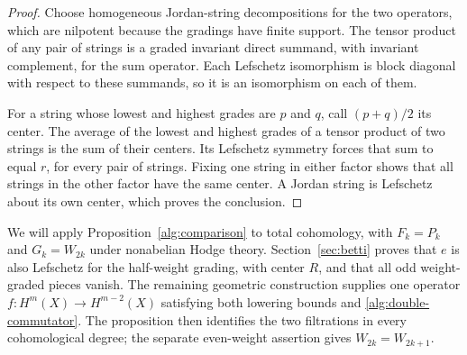 \begin{proof}
Choose homogeneous Jordan-string decompositions for the two operators,
which are nilpotent because the gradings have finite support.
The tensor product of any pair of strings is a graded invariant direct
summand, with invariant complement, for the sum operator.  Each
Lefschetz isomorphism is block diagonal with respect to these summands,
so it is an isomorphism on each of them.

For a string whose lowest and highest grades are $p$ and $q$, call
$(p+q)/2$ its center.  The average of the lowest and highest grades of
a tensor product of two strings is the sum of their centers.  Its
Lefschetz symmetry forces that sum to equal $r$, for every pair of
strings.  Fixing one string in either factor shows that all strings
in the other factor have the same center.  A Jordan string is
Lefschetz about its own center, which proves the conclusion.
\end{proof}

We will apply Proposition~\ref{alg:comparison} to total cohomology,
with $F_k=P_k$ and $G_k=W_{2k}$ under nonabelian Hodge theory.
Section~\ref{sec:betti} proves that $e$ is also Lefschetz for the
half-weight grading, with center $R$, and that all odd weight-graded
pieces vanish.  The remaining geometric construction supplies one
operator $f:H^m(X)\to H^{m-2}(X)$ satisfying both lowering bounds
and \eqref{alg:double-commutator}.  The proposition then identifies
the two filtrations in every cohomological degree; the separate
even-weight assertion gives $W_{2k}=W_{2k+1}$.
